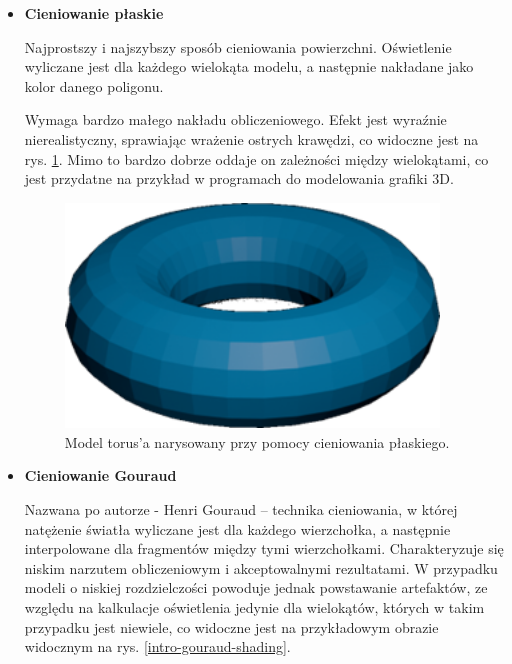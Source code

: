 \begin{itemize}
	\item \textbf{Cieniowanie płaskie}

	Najprostszy i najszybszy sposób cieniowania powierzchni. Oświetlenie wyliczane jest dla każdego wielokąta modelu, a następnie nakładane jako kolor danego poligonu.
	
	Wymaga bardzo małego nakładu obliczeniowego. Efekt jest wyraźnie nierealistyczny, sprawiając wrażenie ostrych krawędzi, co widoczne jest na rys. \ref{intro-flat-shading}. Mimo to bardzo dobrze oddaje on zależności między wielokątami, co jest przydatne na przykład w programach do modelowania grafiki 3D.

	\begin{figure}[htbp]
		\centering
		\includegraphics[width=3.90833in,height=2.34916in]{images/3_flat_shading_torus.png}
		\caption{Model torus'a narysowany przy pomocy cieniowania płaskiego.}
		\label{intro-flat-shading}
	\end{figure}

	\item \textbf{Cieniowanie Gouraud}
	
	Nazwana po autorze - Henri Gouraud -- technika cieniowania, w której natężenie światła wyliczane jest dla każdego wierzchołka, a następnie interpolowane dla fragmentów między tymi wierzchołkami. Charakteryzuje się niskim narzutem obliczeniowym i akceptowalnymi rezultatami. W przypadku modeli o niskiej rozdzielczości powoduje jednak powstawanie artefaktów, ze względu na kalkulacje oświetlenia jedynie dla wielokątów, których w takim przypadku jest niewiele, co widoczne jest na przykładowym obrazie widocznym na rys. \ref{intro-gouraud-shading}.


\end{itemize}
